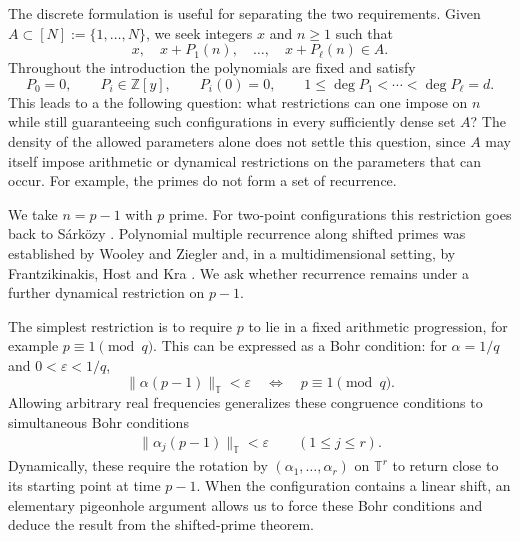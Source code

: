 \documentclass[12pt]{amsart}
\newcommand{\1}{\mathbf 1}
\theoremstyle{definition}
\begin{document}
The discrete formulation is useful for separating the two requirements.
Given $A\subset[N]:=\{1,\ldots,N\}$, we seek integers $x$ and
$n\geq1$ such that
\begin{equation}\label{e:intro-pattern}
 x,\quad x+P_1(n),\quad\ldots,\quad x+P_\ell(n)\in A.
\end{equation}
Throughout the introduction the polynomials are fixed and satisfy
\begin{equation}\label{e:fixed-polynomials}
 P_0=0,\qquad P_i\in\mathbb Z[y],\qquad P_i(0)=0,\qquad
 1\leq\deg P_1<\cdots<\deg P_\ell=d.
\end{equation}
This leads to a the following question: what restrictions can one impose on $n$
while still guaranteeing such configurations in every sufficiently dense
set $A$? The density of the allowed
parameters alone does not settle this question, since $A$ may
itself impose arithmetic or dynamical restrictions on the
parameters that can occur. For example, the primes do not form
a set of recurrence.

We take $n=p-1$ with $p$ prime. For two-point configurations this
restriction goes back to S\'ark\"ozy \cite{Sarkozy}. Polynomial
multiple recurrence along shifted primes was established by Wooley
and Ziegler \cite{WooleyZiegler} and, in a multidimensional setting,
by Frantzikinakis, Host and Kra \cite{FHK}. We ask whether recurrence remains under a further dynamical
restriction on $p-1$.


The simplest restriction is to require $p$ to lie in a fixed arithmetic
progression, for example $p\equiv1\pmod q$. This can be expressed as
a Bohr condition: for $\alpha=1/q$ and $0<\varepsilon<1/q$,
\[
 \|\alpha(p-1)\|_{\mathbb T}<\varepsilon
 \quad\Longleftrightarrow\quad p\equiv1\pmod q.
\]
Allowing arbitrary real frequencies generalizes these congruence
conditions to simultaneous Bohr conditions
\begin{align}\label{e:bohrcondition}
 \|\alpha_j(p-1)\|_{\mathbb T}<\varepsilon
 \qquad(1\leq j\leq r).
\end{align}
Dynamically, these require the rotation by
$(\alpha_1,\ldots,\alpha_r)$ on $\mathbb T^r$ to return close to its
starting point at time $p-1$.
When the configuration contains a linear shift, an elementary pigeonhole
argument allows us to force these Bohr conditions and deduce the result
from the shifted-prime theorem.
\end{document}
